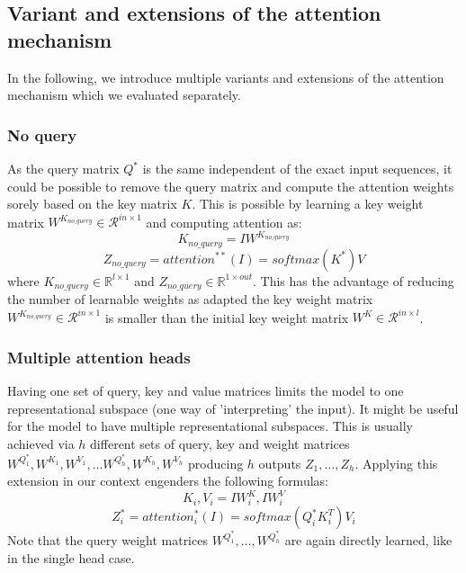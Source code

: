 \subsection{Variant and extensions of the attention mechanism} \label{subsec:alternative_attention}
In the following, we introduce multiple variants and extensions of the attention mechanism which we evaluated separately.



\subsubsection{No query} \label{subsubsec:noquery}
As the query matrix ${Q}^*$ is the same independent of the exact input sequences, it could be possible to remove the query matrix and compute the attention weights sorely based on the key matrix $K$.
This is possible by learning a key weight matrix $W^{K_{no\_query}} \in \mathcal{R}^{in \times 1}$ and computing attention as:
$$K_{no\_query} = IW^{K_{no\_query}}$$
$$Z_{no\_query} = {attention}^{**}(I) = softmax(K^*)V$$
where $K_{no\_query} \in \mathbb{R}^{l \times 1}$ and $Z_{no\_query} \in \mathbb{R}^{1 \times out}$. This has the advantage of reducing the number of learnable weights as adapted the key weight matrix $W^{K_{no\_query}} \in \mathcal{R}^{in \times 1}$ is smaller than the initial key weight matrix $W^{K} \in \mathcal{R}^{in \times l}$.  


\subsubsection{Multiple attention heads} \label{subsubsec:heads}
Having one set of query, key and value matrices limits the model to one representational subspace (one way of 'interpreting' the input). It might be useful for the model to have multiple representational subspaces. This is usually achieved \cite{allyouneed} via $h$ different sets of query, key and weight matrices $W^{Q^*_1}, W^{K_1}, W^{V_1}, \dots W^{Q^*_{h}}, W^{K_{h}},W^{V_{h}}$ producing $h$  outputs $Z_1, \dots, Z_{h}$. Applying this extension in our context engenders the following formulas:
$$K_i, V_i = IW^K_i, IW^V_i$$
$$Z^*_i = {attention}^*_i(I) = softmax({Q}^*_iK^T_i)V_i$$
Note that the query weight matrices $W^{Q^*_1}, \dots, W^{Q^*_h}$ are again directly learned, like in the single head case. 

